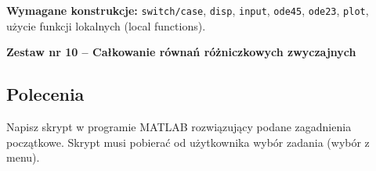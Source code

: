 \documentclass[a4paper,11pt]{article}
\begin{document}
\vspace{0.3cm}
\begin{ramka}
\textbf{Wymagane konstrukcje:}
\texttt{switch/case}, \texttt{disp}, \texttt{input}, \texttt{ode45}, \texttt{ode23}, \texttt{plot}, użycie funkcji lokalnych (local functions).
\end{ramka}

\clearpage
\begin{center}
  {\large\bfseries Zestaw nr 10 \quad -- \quad Całkowanie równań różniczkowych zwyczajnych}
\end{center}
\hrulefill
\vspace{0.4cm}

\subsection*{Polecenia}

Napisz skrypt w programie MATLAB rozwiązujący podane zagadnienia początkowe. Skrypt musi pobierać od użytkownika wybór zadania (wybór z menu).
\end{document}
